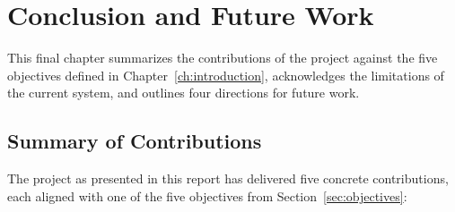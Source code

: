 \chapter{Conclusion and Future Work}
\label{ch:conclusion}

This final chapter summarizes the contributions of the project
against the five objectives defined in Chapter~\ref{ch:introduction},
acknowledges the limitations of the current system, and outlines
four directions for future work.

\section{Summary of Contributions}
\label{sec:conclusion-contrib}

The project as presented in this report has delivered five concrete
contributions, each aligned with one of the five objectives from
Section~\ref{sec:objectives}:

